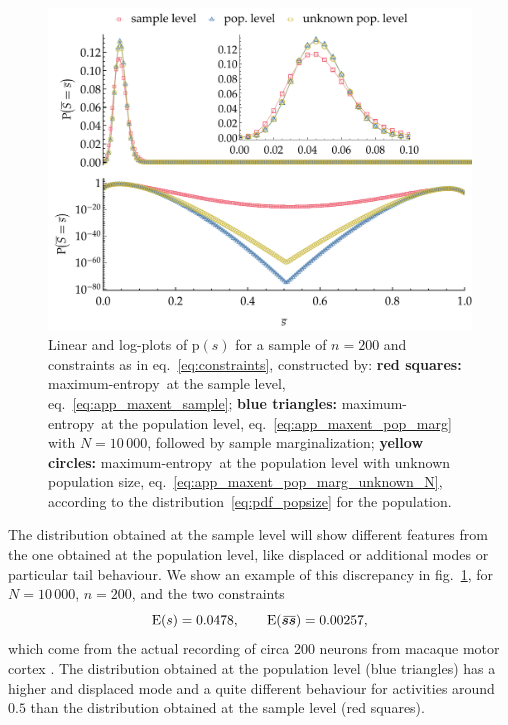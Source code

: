 \documentclass[\ifafour a4paper,12pt,\else a5paper,10pt,\fi%
onecolumn,oneside,article,%
british%
]{memoir}
\theoremstyle{remark}
\theoremstyle{innote}
\newcommand*{\citep}{\parencites}
\newcommand*{\pf}{\mathrm{p}}%
\newcommand*{\E}{\mathrm{E}}
\renewcommand*{\|}{\nonscript\,\vert\nonscript\;\mathopen{}}
\newcommand*{\eqn}{eq.}%
\newcommand*{\fig}{fig.}%
\newcommand*{\widebar}[1]{{\mkern1.5mu\skew{2}\overline{\mkern-1.5mu#1\mkern-1.5mu}\mkern 1.5mu}}
\newcommand*{\sav}{\widebar} %
\newcommand*{\yrv}{s}
\newcommand*{\yNv}{N}
\newcommand*{\yrrs}{\sav{\yr\yr}}%
\newcommand*{\yr}{\bm{\yrv}}%
\newcommand*{\yrs}{\yrv}%
\newcommand*{\me}{maximum-entropy}
\begin{document}
\begin{figure}[!t]
\centering
\includegraphics[width=\linewidth]{comparison3.pdf}%
\caption{Linear and log-plots of $\pf(\yrs)$ for a sample of $n=200$
  and constraints as in \eqn~\eqref{eq:constraints}, constructed by:
  \textcolor{myred}{\textbf{red squares:}} \me\ at the sample level,
  \eqn~\eqref{eq:app_maxent_sample};
  \textcolor{mypurpleblue}{\textbf{blue triangles:}} \me\ at the
  population level, \eqn~\eqref{eq:app_maxent_pop_marg} with
  $\yNv=10\,000$, followed by sample marginalization;
  \textcolor{myyellow}{\textbf{yellow circles:}} \me\ at the population
  level with unknown population size,
  \eqn~\eqref{eq:app_maxent_pop_marg_unknown_N}, according to the
  distribution~\eqref{eq:pdf_popsize} for the population.}
\label{fig:all_three}
\end{figure}%
The distribution obtained at the sample level will show different
features from the one obtained at the population level, like displaced or
additional modes or particular tail behaviour. We show an example of this
discrepancy in \fig~\ref{fig:all_three}, for
$\yNv=10\,000$, $n=200$, and the two constraints
\begin{equation}
  \label{eq:constraints}
  \E(\yrs) = 0.0478,\qquad
  \E(\yrrs) = 0.00257,
\end{equation}
which come from the actual recording of circa 200 neurons from macaque
motor cortex \citep{rostamietal2016_r2017}. The distribution obtained at the
population level (blue triangles) has a higher and displaced mode and a quite
different behaviour for activities around $0.5$ than the distribution
obtained at the sample level (red squares).
\end{document}
